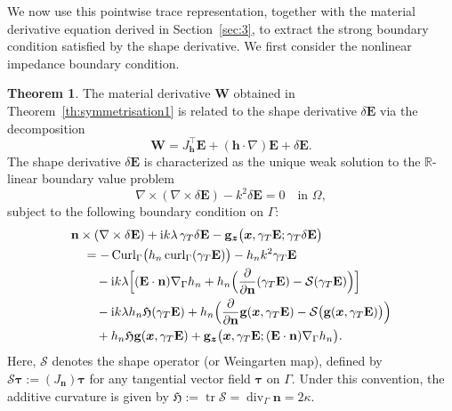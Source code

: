 \documentclass[12pt,reqno]{amsart}
\theoremstyle{definition}
\newtheorem{theo}{Theorem}[section]
\numberwithin{equation}{section}
\begin{document}
We now use this pointwise trace representation, together with the material
derivative equation derived in Section~\ref{sec:3}, to extract the strong
boundary condition satisfied by the shape derivative. We first consider the
nonlinear impedance boundary condition.
\begin{theo}\label{th:shape_derivative_nibc}
The material derivative $\mathbf{W}$ obtained in Theorem~\ref{th:symmetrisation1} is related to the shape derivative $\delta\mathbf{E}$ via the decomposition
\begin{equation}
\label{eq:material_derivative_decomposition}
\mathbf{W} = J_{\mathbf{h}}^{\top}\mathbf{E} + (\mathbf{h} \cdot \nabla) \mathbf{E} + \delta\mathbf{E}.
\end{equation}
The shape derivative $\delta\mathbf{E}$ is characterized as the unique weak solution to the $\mathbb{R}$-linear boundary value problem
\begin{equation}
\nabla \times (\nabla \times \delta\mathbf{E}) - k^2 \delta\mathbf{E} = 0 \quad \text{in } \Omega,
\end{equation}
subject to the following boundary condition on $\Gamma$:
\begin{equation}
\label{eq:shape1}
\begin{aligned}
&\mathbf{n} \times (\nabla \times \delta\mathbf{E}) + \mathrm{i}k\lambda\,\gamma_T \delta\mathbf{E} - \mathbf{g}_{\boldsymbol{z}}\bigl(\boldsymbol{x}, \gamma_T \mathbf{E}; \gamma_T \delta\mathbf{E}\bigr) \\
&\quad = -\operatorname{Curl}_\Gamma \bigl( h_n \operatorname{curl}_\Gamma(\gamma_T \mathbf{E}) \bigr) - h_n k^2 \gamma_T \mathbf{E} \\
&\qquad - \mathrm{i}k\lambda \Bigl[ (\mathbf{E} \cdot \mathbf{n}) \nabla_\Gamma h_n + h_n \Bigl( \frac{\partial}{\partial \mathbf{n}}(\gamma_T \mathbf{E}) - \mathcal{S}(\gamma_T \mathbf{E}) \Bigr) \Bigr] \\
&\qquad - \mathrm{i}k\lambda h_n \mathfrak{H} (\gamma_T \mathbf{E}) + h_n \Bigl( \frac{\partial}{\partial \mathbf{n}} \mathbf{g}(\boldsymbol{x}, \gamma_T \mathbf{E}) - \mathcal{S}\bigl( \mathbf{g}(\boldsymbol{x}, \gamma_T \mathbf{E}) \bigr) \Bigr) \\
&\qquad + h_n \mathfrak{H} \mathbf{g}(\boldsymbol{x}, \gamma_T \mathbf{E}) + \mathbf{g}_{\boldsymbol{z}} \bigl( \boldsymbol{x}, \gamma_T \mathbf{E}; (\mathbf{E} \cdot \mathbf{n}) \nabla_\Gamma h_n \bigr).
\end{aligned}
\end{equation}
Here, $\mathcal{S}$ denotes the shape operator (or Weingarten map), defined by $\mathcal{S} \boldsymbol{\tau} := (J_{\mathbf{n}}) \boldsymbol{\tau}$ for any tangential vector field $\boldsymbol{\tau}$ on $\Gamma$. Under this convention, the additive  curvature is given by $\mathfrak{H} := \operatorname{tr} \mathcal{S} = \operatorname{div}_\Gamma \mathbf{n} = 2\kappa$. 


\end{theo}
\end{document}
